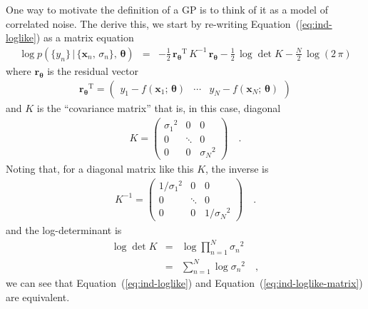 \documentclass[modern, letterpaper]{aastex61}
\renewcommand{\eqref}[1]{\ref{eq:#1}}
\newcommand{\Eq}[1]{Equation~(\eqref{#1})}
\newcommand{\eq}[1]{\Eq{#1}}
\newcommand{\eqlabel}[1]{\label{eq:#1}}
\newcommand{\T}{\ensuremath{\mathrm{T}}}
\newcommand{\bvec}[1]{{\ensuremath{\boldsymbol{#1}}}}
\begin{document}
One way to motivate the definition of a GP is to think of it as a model of
correlated noise.
The derive this, we start by re-writing \eq{ind-loglike} as a matrix equation
\begin{eqnarray}\eqlabel{ind-loglike-matrix}
\log p(\{y_n\}\,|\,\{\bvec{x}_n,\,\sigma_n\},\,\bvec{\theta}) &=&
    -\frac{1}{2}\,{\bvec{r}_\bvec{\theta}}^\T\,K^{-1}\,{\bvec{r}_\bvec{\theta}}
    -\frac{1}{2}\,\log\det K
    -\frac{N}{2}\,\log(2\,\pi)
\end{eqnarray}
where $\bvec{r}_\bvec{\theta}$ is the residual vector
\begin{eqnarray}
{\bvec{r}_\bvec{\theta}}^\T = \left(\begin{array}{ccc}
    y_1 - f(\bvec{x}_1;\,\bvec{\theta}) & \cdots &
    y_N - f(\bvec{x}_N;\,\bvec{\theta})
\end{array}\right)
\end{eqnarray}
and $K$ is the ``covariance matrix'' that is, in this case, diagonal
\begin{eqnarray}\eqlabel{diag-cov}
K = \left(\begin{array}{ccc}
    {\sigma_1}^2 & 0 & 0 \\
    0 & \ddots & 0 \\
    0 & 0 & {\sigma_N}^2
\end{array}\right) \quad.
\end{eqnarray}
Noting that, for a diagonal matrix like this $K$, the inverse is
\begin{eqnarray}
K^{-1} = \left(\begin{array}{ccc}
    1/{\sigma_1}^2 & 0 & 0 \\
    0 & \ddots & 0 \\
    0 & 0 & 1/{\sigma_N}^2
\end{array}\right) \quad.
\end{eqnarray}
and the log-determinant is
\begin{eqnarray}
    \log\det K &=& \log \prod_{n=1}^N {\sigma_n}^2 \\
    &=& \sum_{n=1}^N \log{\sigma_n}^2 \quad,
\end{eqnarray}
we can see that \eq{ind-loglike} and \eq{ind-loglike-matrix} are equivalent.
\end{document}
